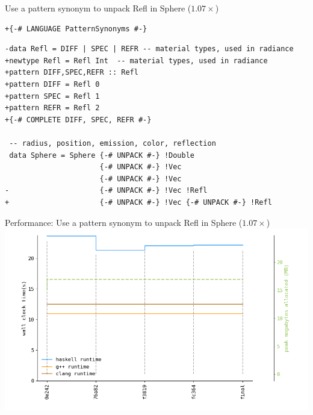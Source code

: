 \documentclass[8pt]{beamer}
\begin{document}
\begin{frame}[fragile]{Use a pattern synonym to unpack Refl in Sphere ($1.07\times$)}

\begin{verbatim}
+{-# LANGUAGE PatternSynonyms #-}
\end{verbatim}


\begin{verbatim}
-data Refl = DIFF | SPEC | REFR -- material types, used in radiance
+newtype Refl = Refl Int  -- material types, used in radiance
+pattern DIFF,SPEC,REFR :: Refl
+pattern DIFF = Refl 0
+pattern SPEC = Refl 1
+pattern REFR = Refl 2
+{-# COMPLETE DIFF, SPEC, REFR #-}

 -- radius, position, emission, color, reflection
 data Sphere = Sphere {-# UNPACK #-} !Double 
                      {-# UNPACK #-} !Vec
                      {-# UNPACK #-} !Vec 
-                     {-# UNPACK #-} !Vec !Refl
+                     {-# UNPACK #-} !Vec {-# UNPACK #-} !Refl

 \end{verbatim}



\end{frame}


\begin{frame}[fragile]{Performance: Use a pattern synonym to unpack Refl in Sphere ($1.07\times$)}
\includegraphics[height=0.6\textwidth]{perfdata-upto-fc364-gen.png}
\end{frame}
\end{document}
